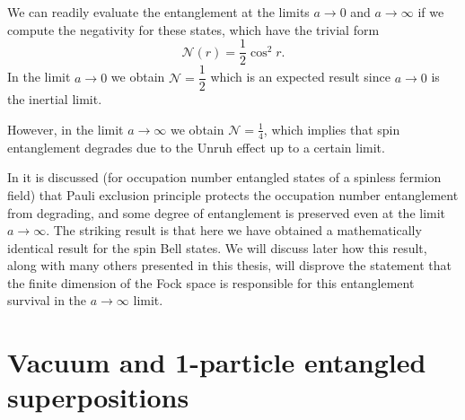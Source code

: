 We can readily evaluate the entanglement at the limits $a\rightarrow0$ and $a\rightarrow\infty$ if we compute the negativity for these states, which have the trivial form
\begin{equation}
\mathcal{N}(r)=\frac12\cos^2 r.
\end{equation}
In the limit $a\rightarrow0$ we obtain $\mathcal{N}=\dfrac12$ which is an expected result since $a\rightarrow0$ is the inertial limit.

However, in the limit $a\rightarrow\infty$ we obtain $\mathcal{N}=\frac{1}{4}$, which implies that spin entanglement degrades due to the Unruh effect up to a certain limit.

In \cite{AlsingSchul} it is discussed (for occupation number entangled states of a spinless fermion field) that Pauli exclusion principle protects the occupation number entanglement from degrading, and some degree of entanglement is preserved even at the limit $a\rightarrow\infty$. The striking result is that here we have obtained a mathematically identical result for the spin Bell states. We will discuss later how this result, along with many others presented in this thesis, will disprove the statement that the finite dimension of the Fock space is responsible for this entanglement survival in the $a\rightarrow\infty$ limit.

\section{Vacuum and 1-particle entangled superpositions}

